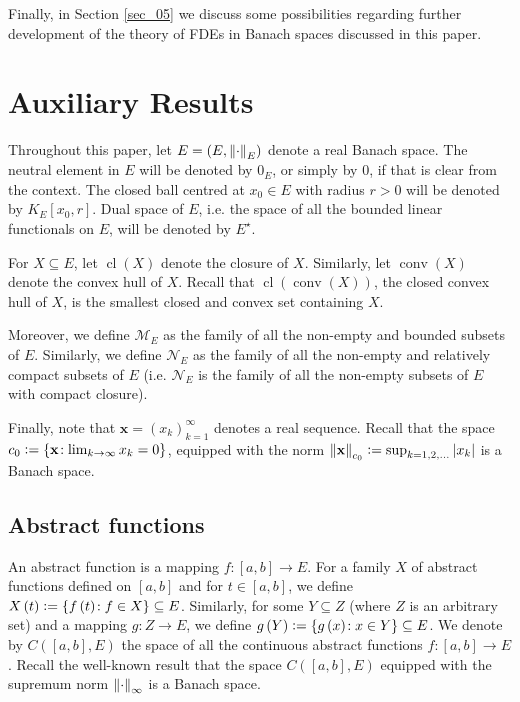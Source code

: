 \documentclass[reqno]{amsart}
\numberwithin{equation}{section}
\theoremstyle{definition}
\theoremstyle{remark}
\newcommand{\ball}[3]{K_{#1}\sbr{#2,#3}}
\newcommand{\br}[1]{\left(#1\right)}
\newcommand{\bx}{\mathbf{x}}
\newcommand{\C}[2]{C\br{#1,#2}}
\newcommand{\cbr}[1]{\left\{#1\right\}}
\newcommand{\cl}[1]{\clOperator\br{#1}}
\newcommand{\conv}[1]{\convOperator\br{#1}}
\newcommand{\defeq}{\vcentcolon=}
\newcommand{\fM}{\mathcal{M}}
\newcommand{\fN}{\mathcal{N}}
\newcommand{\sbr}[1]{\left[#1\right]}
\newcommand{\sE}{E^{\star}}
\newcommand{\sectionRef}[1]{\textrm{Section \ref{#1}}}
\newcommand{\st}{\!:}
\DeclareMathOperator{\clOperator}{cl}
\DeclareMathOperator{\convOperator}{conv}
\begin{document}
	Finally, in \sectionRef{sec_05} we discuss some possibilities regarding further development of the theory of FDEs in Banach spaces discussed in this paper.

	\section{Auxiliary Results}\label{sec_02}
	\setcounter{section}{2}
	\setcounter{equation}{0}
	Throughout this paper, let $E=\br{E,\norm{\cdot}_E}$ denote a real Banach space. The neutral element in $E$ will be denoted by $0_E$, or simply by $0$, if that is clear from the context. The closed ball centred at $x_0\in{E}$ with radius $r>0$ will be denoted by $\ball{E}{x_0}{r}$. Dual space of $E$, i.e. the space of all the bounded linear functionals on $E$, will be denoted by $\sE$.
	
	For $X\subseteq{E}$, let $\cl{X}$ denote the closure of $X$. Similarly, let $\conv{X}$ denote the convex hull of $X$. Recall that $\cl{\conv{X}}$, the closed convex hull of $X$, is the smallest closed and convex set containing $X$.
	
	Moreover, we define $\fM_E$ as the family of all the non-empty and bounded subsets of $E$. Similarly, we define $\fN_E$ as the family of all the non-empty and relatively compact subsets of $E$ (i.e. $\fN_E$ is the family of all the non-empty subsets of $E$ with compact closure).
	
	Finally, note that $\bx=\br{x_k}_{k=1}^{\infty}$ denotes a real sequence. Recall that the space $c_0\defeq\cbr{\bx\st\lim_{k\rightarrow\infty}x_k=0}$, equipped with the norm $\norm{\bx}_{c_0}\defeq\sup_{k=1,2,\dots}\abs{x_k}$ is a Banach space.
	
	\subsection{Abstract functions}
	An abstract function is a mapping $f\st\sbr{a,b}\rightarrow{E}$. For a family $X$ of abstract functions defined on $\sbr{a,b}$ and for $t\in\sbr{a,b}$, we define $X\br{t}\defeq\cbr{f\br{t}\st{f}\in{X}}\subseteq{E}$. Similarly, for some $Y\subseteq{Z}$ (where $Z$ is an arbitrary set) and a mapping $g\st{Z}\rightarrow{E}$, we define $g\br{Y}\defeq\cbr{g\br{x}\st{x}\in{Y}}\subseteq{E}$. We denote by $\C{\sbr{a,b}}{E}$ the space of all the continuous abstract functions $f\st\sbr{a,b}\rightarrow{E}$. Recall the well-known result that the space $\C{\sbr{a,b}}{E}$ equipped with the supremum norm $\norm{\cdot}_{\infty}$ is a Banach space.
	
\end{document}
